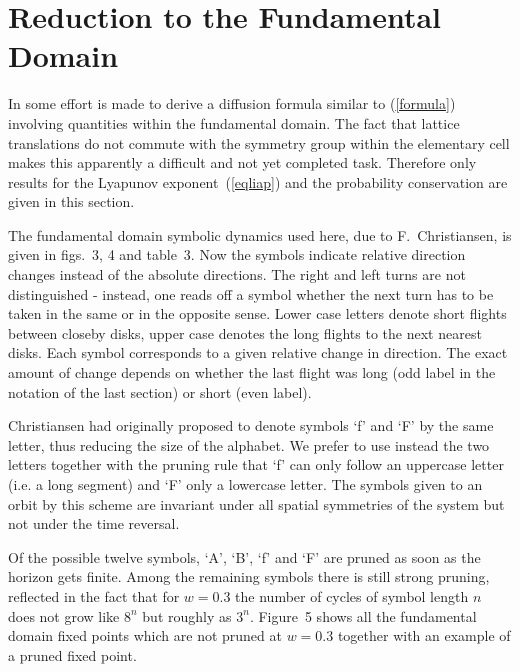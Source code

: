 \documentclass[pre,twocolumn,groupedaddress,showpacs,showkeys]{revtex4}
\begin{document}
\section{Reduction to the Fundamental Domain}
In \cite{CEG} some effort is made to derive a diffusion formula similar to
(\ref{formula}) involving quantities within the fundamental domain. The
fact that lattice translations do not commute with the symmetry group within
the elementary cell makes this apparently a difficult and
not yet completed task.
Therefore only results for the Lyapunov exponent~(\ref{eqliap}) and the
probability conservation are given in this section.

The fundamental domain
symbolic dynamics used here, due to
F.~Christiansen, is
given in figs.~3, 4 and table~3.
Now the symbols indicate relative direction changes
instead of the absolute directions.
The right and left turns are not distinguished - instead,  one reads
off a symbol whether the next
turn has to be taken in the same or in the opposite sense.
%
Lower case letters denote short flights between closeby disks, upper case
denotes the long flights to the next nearest disks.
Each symbol corresponds to a given relative change
in direction. The exact amount of
change depends on whether the last flight was
long (odd label in the notation of the last section) or short (even label).

Christiansen had
originally proposed to denote symbols `f' and `F' by the same
letter, thus reducing the size of the alphabet.
We prefer to use instead the
two letters together with the
pruning rule that `f' can only follow an uppercase
letter (i.e. a long segment) and `F' only a lowercase letter.
The symbols given to an orbit by this scheme are invariant under all spatial
symmetries of the system but not under the time reversal.

Of the possible twelve symbols,  `A', `B', `f' and `F'
are pruned as soon as the horizon gets finite.
Among the remaining symbols there is
still strong pruning,  reflected in the fact that
for $w = 0.3$ the
number of cycles of symbol length $n$
does not grow like $8^n$ but roughly as
$3^n$. Figure~5 shows all the fundamental domain fixed
points which are not pruned at $w=0.3$ together with an example
of a pruned fixed point.
\end{document}
